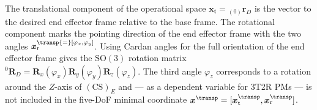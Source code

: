 \documentclass[
	graybox,
	vecphys] %
	{svmult}
\newcommand{\bm}[1]{\boldsymbol{#1}}
\newcommand{\ks}[1]{{(\mathrm{CS})}_{#1}}
\newcommand{\ortvek}[4]{{ }_{(#1)}{\boldsymbol{#2}}^{#3}_{#4} }
\newcommand{\rotmat}[2]{{{ }^{#1}\boldsymbol{R}}_{#2}}
\begin{document}
The translational component of the operational space $\bm{x}_{\mathrm{t}}{=}\ortvek{0}{r}{}{D}$ is the vector to the desired end effector frame relative to the base frame.
The rotational component marks the pointing direction of the end effector frame with the two angles $\bm{x}_{\mathrm{r}}^\transp{=}[\varphi_x,\varphi_y]$.
Using Cardan angles for the full orientation of the end effector frame gives the $\mathrm{SO(3)}$ rotation matrix $\rotmat{0}{D} {=} \bm{R}_x(\varphi_x) \bm{R}_y(\varphi_y) \bm{R}_z(\varphi_z)$.
The third angle $\varphi_z$ corresponds to a rotation around the $Z$-axis of $\ks{E}$ and --- as a dependent variable for 3T2R PMs --- is not included in the five-DoF minimal coordinate $\bm{x}^\transp=[\bm{x}_\mathrm{t}^\transp,\bm{x}_\mathrm{r}^\transp]$.

\end{document}

